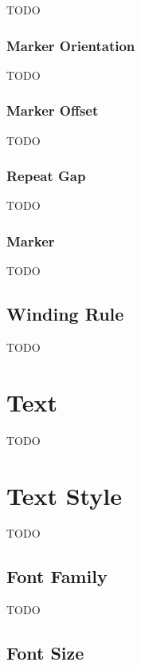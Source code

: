 TODO


\subsubsection{Marker Orientation}\label{sec:markerorientation}

TODO


\subsubsection{Marker Offset}\label{sec:markeroffset}

TODO


\subsubsection{Repeat Gap}\label{sec:repeatgap}

TODO


\subsubsection{Marker }\label{sec:markerpaint}

TODO


\subsection{Winding Rule}\label{sec:winding}

TODO


\section{Text }\label{sec:textpaint}

TODO


\section{Text Style}\label{sec:textstyle}

TODO


\subsection{Font Family}\label{sec:fontfamily}


TODO


\subsection{Font Size}\label{sec:fontsize}

